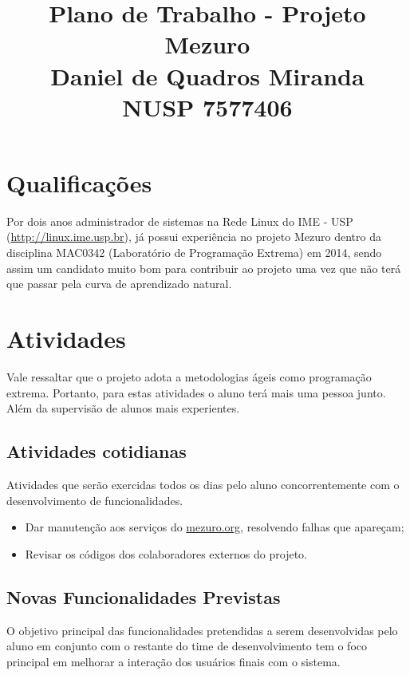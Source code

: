\documentclass[12pt]{article}
\begin{document}
  \title{Plano de Trabalho - Projeto Mezuro\\
         Daniel de Quadros Miranda\\
         NUSP 7577406}

  \maketitle

  \section{Qualificações}
  Por dois anos administrador de sistemas na Rede Linux do IME - USP (\url{http://linux.ime.usp.br}), já possui experiência no projeto Mezuro dentro da disciplina MAC0342 (Laboratório de Programação Extrema) em 2014, sendo assim um candidato muito bom para contribuir ao projeto uma vez que não terá que passar pela curva de aprendizado natural.

  \section{Atividades}
    Vale ressaltar que o projeto adota a metodologias ágeis como programação extrema. Portanto, para estas atividades o aluno terá mais uma pessoa junto. Além da supervisão de alunos mais experientes.

    \subsection{Atividades cotidianas}
      Atividades que serão exercidas todos os dias pelo aluno concorrentemente com o desenvolvimento de funcionalidades.

      \begin{itemize}
        \item Dar manutenção aos serviços do \url{mezuro.org}, resolvendo falhas que apareçam;
        \item Revisar os códigos dos colaboradores externos do projeto.
      \end{itemize}

    \subsection{Novas Funcionalidades Previstas}\label{subsec:func-prev}
      O objetivo principal das funcionalidades pretendidas a serem desenvolvidas pelo aluno em conjunto com o restante do time de desenvolvimento tem o foco principal em melhorar a interação dos usuários finais com o sistema.
\end{document}
